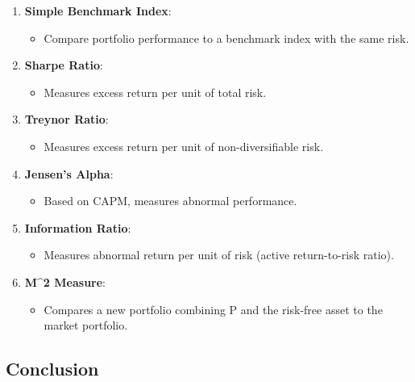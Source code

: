 \documentclass[
]{book}
\providecommand{\tightlist}{%
  \setlength{\itemsep}{0pt}\setlength{\parskip}{0pt}}
\begin{document}
\begin{enumerate}
\def\labelenumi{\arabic{enumi}.}
\tightlist
\item
  \textbf{Simple Benchmark Index}:

  \begin{itemize}
  \tightlist
  \item
    Compare portfolio performance to a benchmark index with the same
    risk.
  \end{itemize}
\item
  \textbf{Sharpe Ratio}:

  \begin{itemize}
  \tightlist
  \item
    Measures excess return per unit of total risk.
  \end{itemize}
\item
  \textbf{Treynor Ratio}:

  \begin{itemize}
  \tightlist
  \item
    Measures excess return per unit of non-diversifiable risk.
  \end{itemize}
\item
  \textbf{Jensen's Alpha}:

  \begin{itemize}
  \tightlist
  \item
    Based on CAPM, measures abnormal performance.
  \end{itemize}
\item
  \textbf{Information Ratio}:

  \begin{itemize}
  \tightlist
  \item
    Measures abnormal return per unit of risk (active return-to-risk
    ratio).
  \end{itemize}
\item
  \textbf{M\^{}2 Measure}:

  \begin{itemize}
  \tightlist
  \item
    Compares a new portfolio combining P and the risk-free asset to the
    market portfolio.
  \end{itemize}
\end{enumerate}

\hypertarget{conclusion}{%
\subsection{Conclusion}\label{conclusion}}
\end{document}
